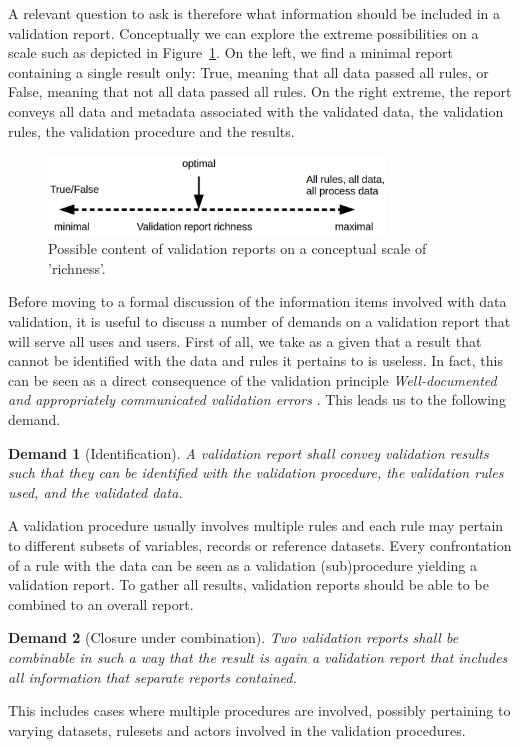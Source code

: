 \documentclass[a4paper, 11pt]{article}
\newtheorem{demand}{Demand}
\begin{document}
A relevant question to ask is therefore what information should be included in
a validation report. Conceptually we can explore the extreme possibilities on a
scale such as depicted in Figure~\ref{fig:richness}. On the left, we find a minimal report
containing a single result only: True, meaning that all data passed all rules,
or False, meaning that not all data passed all rules. On the right extreme, the
report conveys all data and metadata associated with the validated data, the
validation rules, the validation procedure and the results.
%
\begin{figure}
\centering
\includegraphics[width=0.8\textwidth]{fig/richness.png}
\caption{Possible content of validation reports on a conceptual scale of 'richness'.}
\label{fig:richness}
\end{figure}


Before moving to a formal discussion of the information items involved with
data validation, it is useful to discuss a number of demands on a validation
report that will serve all uses and users. First of all, we take as a given
that a result that cannot be identified with the data and rules it pertains to
is useless. In fact, this can be seen as a direct consequence of the validation
principle \emph{Well-documented and appropriately communicated validation errors}
\citep{ESS2017}. This leads us to the following
demand.

\begin{demand}[Identification]
A validation report shall convey validation results such that they can be
identified with the validation procedure, the validation rules used, and the
validated data.
\label{dem:identify}
\end{demand}


A validation procedure usually involves multiple rules and each rule may
pertain to different subsets of variables, records or reference datasets. Every
confrontation of a rule with the data can be seen as a validation
(sub)procedure yielding a validation report. To gather all results, validation
reports should be able to be combined to an overall report.
%
\begin{demand}[Closure under combination]
Two validation reports shall be combinable in such a way that the result is
again a validation report that includes all information that separate reports
contained.
\label{dem:combine}
\end{demand}
%
This includes cases where multiple procedures are involved, possibly pertaining
to varying datasets, rulesets and actors involved in the validation procedures. 
\end{document}

